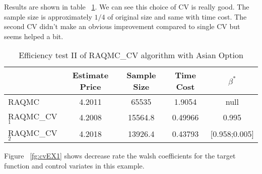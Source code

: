 Results are shown in table ~\ref{tb:efftest2a}. We can see this choice of CV is really good. 
The sample size is approximately $1/4$ of original size and same with time cost. 
The second CV didn't make an obvious improvement compared to single CV but seems helped a bit.    
\begin{table}[h]
    \centering
    \label{tb:efftest2a}
	\caption{Efficiency test II of RAQMC\_CV algorithm with Asian Option}
    \begin{tabular}{lcccc}  
    \hline\hline
    &Estimate Price&Sample Size&Time Cost&$\beta^*$\\[0.5ex]
    \hline
    RAQMC& 4.2011&65535 & 1.9054 & null\\[1ex]
    RAQMC\_CV$_1$&4.2008& 15564.8 & 0.49966& 0.995 \\[1ex]
    RAQMC\_CV$_2$&4.2018& 13926.4 & 0.43793& [0.958;0.005]\\[1ex]
    \hline
	\end{tabular}
\end{table}

\iffalse
Figure ~\ref{fg:cvEX1} shows decrease rate the walsh coefficients for the target function and control variates in this example.

